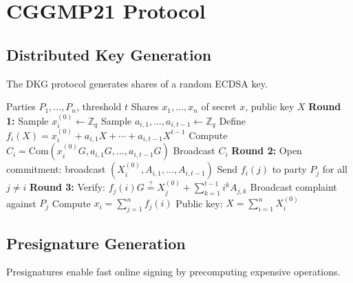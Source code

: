 \documentclass[11pt,a4paper]{article}
\theoremstyle{definition}
\begin{document}
\section{CGGMP21 Protocol}

\subsection{Distributed Key Generation}

The DKG protocol generates shares of a random ECDSA key.

\begin{algorithm}
\caption{CGGMP21 Distributed Key Generation}
\begin{algorithmic}[1]
\Require Parties $P_1, \ldots, P_n$, threshold $t$
\Ensure Shares $x_1, \ldots, x_n$ of secret $x$, public key $X$
\State \textbf{Round 1:}
    \State Sample $x_i^{(0)} \leftarrow \mathbb{Z}_q$
    \State Sample $a_{i,1}, \ldots, a_{i,t-1} \leftarrow \mathbb{Z}_q$
    \State Define $f_i(X) = x_i^{(0)} + a_{i,1}X + \cdots + a_{i,t-1}X^{t-1}$
    \State Compute $C_i = \text{Com}(x_i^{(0)}G, a_{i,1}G, \ldots, a_{i,t-1}G)$
    \State Broadcast $C_i$
\EndFor
\State \textbf{Round 2:}
    \State Open commitment: broadcast $(X_i^{(0)}, A_{i,1}, \ldots, A_{i,t-1})$
    \State Send $f_i(j)$ to party $P_j$ for all $j \neq i$
\EndFor
\State \textbf{Round 3:}
        \State Verify: $f_j(i)G \stackrel{?}{=} X_j^{(0)} + \sum_{k=1}^{t-1} i^k A_{j,k}$
            \State Broadcast complaint against $P_j$
        \EndIf
    \EndFor
    \State Compute $x_i = \sum_{j=1}^{n} f_j(i)$
\EndFor
\State Public key: $X = \sum_{i=1}^{n} X_i^{(0)}$
\end{algorithmic}
\end{algorithm}

\subsection{Presignature Generation}

Presignatures enable fast online signing by precomputing expensive operations.
\end{document}
